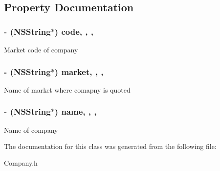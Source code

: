 \subsection{Property Documentation}
\hypertarget{interface_company_afdbbe5e3e648bdca9f87e311bf2c25ec}{
\subsubsection[{code}]{\setlength{\rightskip}{0pt plus 5cm}-\/ (N\-S\-String$\ast$) code\hspace{0.3cm}{\ttfamily [read]}, {\ttfamily [write]}, {\ttfamily [nonatomic]}, {\ttfamily [retain]}}}\label{interface_company_afdbbe5e3e648bdca9f87e311bf2c25ec}
Market code of company \hypertarget{interface_company_a6f8c3fa2cd151fa275edf1b5628ab62b}{
\subsubsection[{market}]{\setlength{\rightskip}{0pt plus 5cm}-\/ (N\-S\-String$\ast$) market\hspace{0.3cm}{\ttfamily [read]}, {\ttfamily [write]}, {\ttfamily [nonatomic]}, {\ttfamily [retain]}}}\label{interface_company_a6f8c3fa2cd151fa275edf1b5628ab62b}
Name of market where comapny is quoted \hypertarget{interface_company_a1787b68b1525e89212ebc3fe8918e23b}{
\subsubsection[{name}]{\setlength{\rightskip}{0pt plus 5cm}-\/ (N\-S\-String$\ast$) name\hspace{0.3cm}{\ttfamily [read]}, {\ttfamily [write]}, {\ttfamily [nonatomic]}, {\ttfamily [retain]}}}\label{interface_company_a1787b68b1525e89212ebc3fe8918e23b}
Name of company 

The documentation for this class was generated from the following file\-:\begin{DoxyCompactItemize}
\item 
Company.\-h\end{DoxyCompactItemize}
